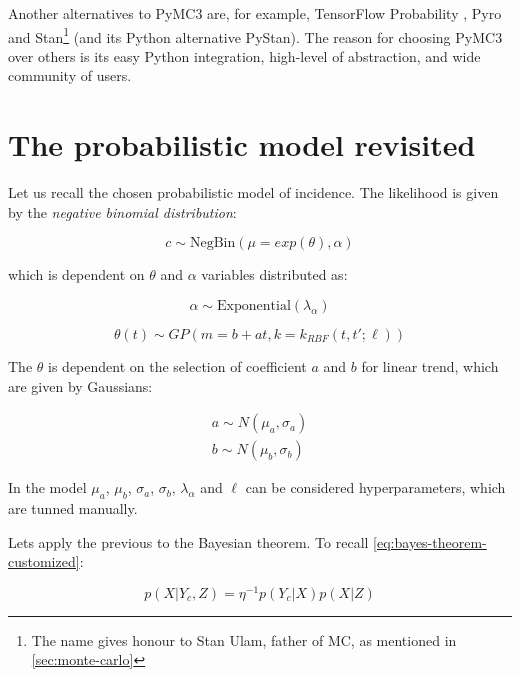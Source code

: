 \documentclass[
  digital, %
  oneside, %
  lof,     %
  lot,     %
]{fithesis4}
\begin{document}
Another alternatives to PyMC3 are, for example,
TensorFlow Probability \cite{tfp}, Pyro \cite{pyro} and
Stan\footnote{The name gives honour to Stan Ulam, father of MC, as mentioned in \autoref{sec:monte-carlo}} \cite{stanmc}
(and its Python alternative PyStan).
The reason for choosing PyMC3 over others is its
easy Python integration, high-level of abstraction,
and wide community of users.


\section{The probabilistic model revisited}

Let us recall the chosen probabilistic model of incidence.
The likelihood is given by the \textit{negative binomial distribution}:

\begin{equation}
  c \sim \text{NegBin} (\mu=exp(\theta), \alpha)
\end{equation}

which is dependent on $\theta$ and $\alpha$ variables distributed as:

\begin{equation}
  \alpha \sim \text{Exponential} (\lambda_\alpha)
\end{equation}

\begin{equation}
  \theta(t) \sim GP(m=b + at, k=k_{RBF} \left( t, t'; \ell \right))
\end{equation}

The $\theta$ is dependent on the selection of 
coefficient $a$ and $b$ for linear trend, which are 
given by Gaussians:

\begin{equation}
  \begin{split}
    a \sim N(\mu_a, \sigma_a) \\
    b \sim N(\mu_b, \sigma_b)
  \end{split}
\end{equation}

In the model $\mu_a$, $\mu_b$, $\sigma_a$, $\sigma_b$, 
$\lambda_\alpha$ and $\ell$ can be 
considered hyperparameters, which are tunned manually.

Lets apply the previous to the Bayesian theorem.
To recall \eqref{eq:bayes-theorem-customized}:

\begin{equation}
  p( X | Y_c, Z ) = \eta^{-1} p( Y_c | X ) p(X | Z)
\end{equation}
\end{document}
